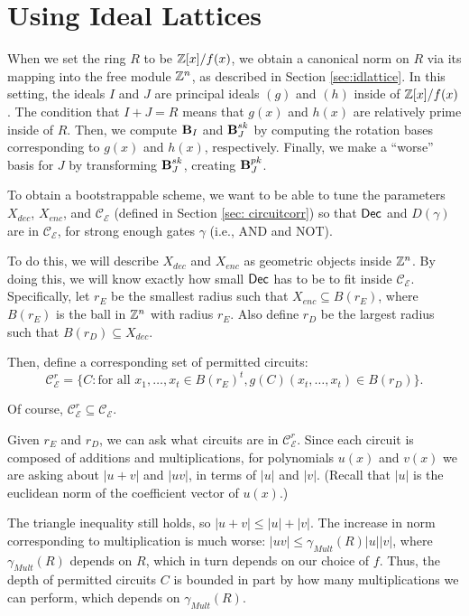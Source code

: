 \section{Using Ideal Lattices}
\label{sec:gentschemeconcrete}

When we set the ring $R$ to be $\mathbb{Z}[x] / f(x)$, we obtain a canonical norm on $R$ via its mapping into the free module $\mathbb{Z}^n$, as described in Section \ref{sec:idlattice}. In this setting, the ideals $I$ and $J$ are principal ideals $(g)$ and $(h)$ inside of $\mathbb{Z}[x] / f(x)$. The condition that $I + J = R$ means that $g(x)$ and $h(x)$ are relatively prime inside of $R$. Then, we compute $\textbf{B}_I$ and $\textbf{B}_J^{sk}$ by computing the rotation bases corresponding to $g(x)$ and $h(x)$, respectively. Finally, we make a ``worse'' basis for $J$ by transforming $\textbf{B}_J^{sk}$, creating $\textbf{B}_J^{pk}$.

To obtain a bootstrappable scheme, we want to be able to tune the parameters $X_{dec}$, $X_{enc}$, and $\mathcal{C}_\mathcal{E}$ (defined in Section \ref{sec: circuitcorr}) so that ${\sf Dec}$ and $D(\gamma)$ are in $\mathcal{C}_\mathcal{E}$, for strong enough gates $\gamma$ (i.e., AND and NOT).

To do this, we will describe $X_{dec}$ and $X_{enc}$ as geometric objects inside $\mathbb{Z}^n$. By doing this, we will know exactly how small ${\sf Dec}$ has to be to fit inside $\mathcal{C}_\mathcal{E}$. Specifically, let $r_E$ be the smallest radius such that $X_{enc} \subseteq B(r_E)$, where $B(r_E)$ is the ball in $\mathbb{Z}^n$ with radius $r_E$. Also define $r_D$ be the largest radius such that $B(r_D) \subseteq X_{dec}$.

Then, define a corresponding set of permitted circuits:
\[\mathcal{C}_\mathcal{E}^r = \{C: \text{for all }x_1, \dots, x_t \in B(r_E)^t, g(C)(x_t, \dots, x_t) \in B(r_D)\}.\]

Of course, $\mathcal{C}_\mathcal{E}^r \subseteq \mathcal{C}_\mathcal{E}$.

Given $r_E$ and $r_D$, we can ask what circuits are in $\mathcal{C}_\mathcal{E}^r$. Since each circuit is composed of additions and multiplications, for polynomials $u(x)$ and $v(x)$ we are asking about $|u+v|$ and $|uv|$, in terms of $|u|$ and $|v|$. (Recall that $|u|$ is the euclidean norm of the coefficient vector of $u(x)$.)

The triangle inequality still holds, so $|u + v| \leq |u| + |v|$. The increase in norm corresponding to multiplication is much worse: $|uv| \leq \gamma_{Mult}(R) |u| |v|$, where $\gamma_{Mult}(R)$ depends on $R$, which in turn depends on our choice of $f$. Thus, the depth of permitted circuits $C$ is bounded in part by how many multiplications we can perform, which depends on $\gamma_{Mult}(R)$.

